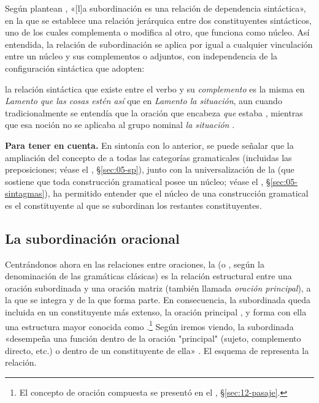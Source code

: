 Según plantean \textcite[731]{bosque2009}, «[l]a subordinación es una relación de
dependencia sintáctica», en la que se establece una relación jerárquica entre dos
constituyentes sintácticos, uno de los cuales complementa o modifica al otro, que
funciona como núcleo. Así entendida, la relación de subordinación se aplica por
igual a cualquier vinculación entre un núcleo y sus complementos o adjuntos, con
independencia de la configuración sintáctica que adopten:

\begin{cita}
la relación sintáctica que existe entre el verbo y su \textit{complemento} es la
misma en \textit{Lamento que las cosas estén así} que en \textit{Lamento la
situación}, aun cuando tradicionalmente se entendía que la oración que encabeza
\textit{que} estaba , mientras que esa noción no se aplicaba al
grupo nominal \textit{la situación} \parencite[§\,1.13m]{rae2025}.
\end{cita}

\begin{destacado}
\textbf{Para tener en cuenta.} En sintonía con lo anterior, se puede señalar que
la ampliación del concepto de  a todas las categorías
gramaticales (incluidas las preposiciones; véase el ,
§\ref{sec:05-sp}), junto con la universalización de la
 (que sostiene que toda construcción gramatical posee un
núcleo; véase el , §\ref{sec:05-sintagmas}), ha permitido entender que
el núcleo de una construcción gramatical es el constituyente al que se
subordinan los restantes constituyentes.
\end{destacado}

\subsection{La subordinación oracional}\label{sec:13-oracional}

Centrándonos ahora en las relaciones entre oraciones, la
 (o , según la denominación de las
gramáticas clásicas) es la relación estructural entre una oración subordinada y
una oración matriz (también llamada \textit{oración principal}), a la que se
integra y de la que forma parte. En consecuencia, la subordinada queda incluida
en un constituyente más extenso, la oración principal
\parencite[214--215]{bosque2019}, y forma con ella una estructura mayor conocida
como .\footnote{El concepto de oración compuesta se
presentó en el , §\ref{sec:12-pasaje}.} Según iremos viendo, la
subordinada «desempeña una función dentro de la oración "principal" (sujeto,
complemento directo, etc.) o dentro de un constituyente de ella»
\parencite[731]{bosque2009}. El esquema de  representa la
relación.

